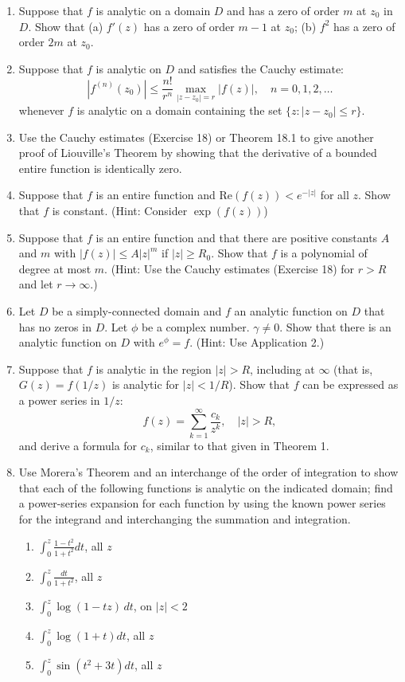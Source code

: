 \documentclass[12pt]{article}
\theoremstyle{definition} %
\theoremstyle{plain} %
\begin{document}
\noindent
\begin{enumerate}
    \item Suppose that $f$ is analytic on a domain $D$ and has a zero of order $m$ at $z_0$ in $D$. Show that (a) $f'(z)$ has a zero of order $m - 1$ at $z_0$; (b) $f^2$ has a zero of order $2m$ at $z_0$.

\item Suppose that $f$ is analytic on $D$ and satisfies the Cauchy estimate:
\[
|f^{(n)}(z_0)| \le \frac{n!}{r^n} \max_{|z - z_0| = r} |f(z)|, \quad n = 0, 1, 2, \dots
\]
whenever $f$ is analytic on a domain containing the set $\{ z : |z - z_0| \le r \}$.

\item Use the Cauchy estimates (Exercise 18) or Theorem 18.1 to give another proof of Liouville’s Theorem by showing that the derivative of a bounded entire function is identically zero.

\item Suppose that $f$ is an entire function and $\text{Re}(f(z)) < e^{-|z|}$ for all $z$. Show that $f$ is constant. (Hint: Consider $\exp(f(z))$)

\item Suppose that $f$ is an entire function and that there are positive constants $A$ and $m$ with $|f(z)| \le A|z|^m$ if $|z| \ge R_0$. Show that $f$ is a polynomial of degree at most $m$. (Hint: Use the Cauchy estimates (Exercise 18) for $r > R$ and let $r \to \infty$.)

\item Let $D$ be a simply-connected domain and $f$ an analytic function on $D$ that has no zeros in $D$. Let $\phi$ be a complex number. $\gamma \ne 0$. Show that there is an analytic function on $D$ with $e^{\phi} = f$. (Hint: Use Application 2.)

\item Suppose that $f$ is analytic in the region $|z| > R$, including at $\infty$ (that is, $G(z) = f(1/z)$ is analytic for $|z| < 1/R$). Show that $f$ can be expressed as a power series in $1/z$:
\[
f(z) = \sum_{k=1}^\infty \frac{c_k}{z^k}, \quad |z| > R,
\]
and derive a formula for $c_k$, similar to that given in Theorem 1.

\item Use Morera’s Theorem and an interchange of the order of integration to show that each of the following functions is analytic on the indicated domain; find a power-series expansion for each function by using the known power series for the integrand and interchanging the summation and integration.
\begin{enumerate}
    \item $\int_0^z \frac{1 - t^2}{1 + t^2} dt$, all $z$
    \item $\int_0^z \frac{dt}{1 + t^2}$, all $z$
    \item $\int_0^z \log(1 - tz) \, dt$, on $|z| < 2$
    \item $\int_0^z \log(1 + t) dt$, all $z$
    \item $\int_0^z \sin(t^2 + 3t) dt$, all $z$
\end{enumerate}


\end{enumerate}
\end{document}
